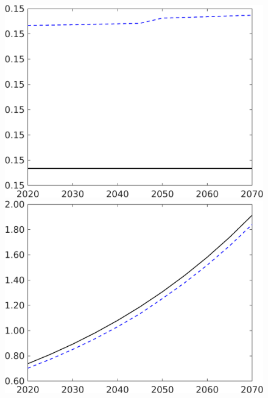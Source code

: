 \begin{figure}[h!!]
\begin{minipage}[]{0.32\textwidth}
	\end{minipage}
	\begin{minipage}[]{0.32\textwidth}
		\includegraphics[width=1\textwidth]{../../codding_model/own_basedOnFried/optimalPol_190722_tidiedUp/figures/all_10Aout22/CountTaul_modxgr_target_LgLf_spillover0_sep1_extern0_PV1_etaa0.79_lgd0.png}
	\end{minipage}
	\begin{minipage}[]{0.32\textwidth}
		\includegraphics[width=1\textwidth]{../../codding_model/own_basedOnFried/optimalPol_190722_tidiedUp/figures/all_10Aout22/CountTaul_modxgr_target_C_spillover0_sep1_extern0_PV1_etaa0.79_lgd0.png}

\end{minipage}
\end{figure}
